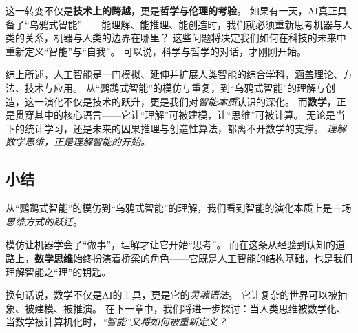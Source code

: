 这一转变不仅是\textbf{技术上的跨越}，更是\textbf{哲学与伦理的考验}。
如果有一天，AI真正具备了“乌鸦式智能”——能理解、能推理、能创造时，我们就必须重新思考机器与人类的关系，机器与人类的边界在哪里？
这些问题将决定我们如何在科技的未来中重新定义“智能”与“自我”。
可以说，科学与哲学的对话，才刚刚开始。

综上所述，人工智能是一门模拟、延伸并扩展人类智能的综合学科，涵盖理论、方法、技术与应用。
从“鹦鹉式智能”的模仿与重复，到“乌鸦式智能”的理解与创造，这一演化不仅是技术的跃升，更是我们对\emph{智能本质}认识的深化。
而\textbf{数学}，正是贯穿其中的核心语言——它让“理解”可被建模，让“思维”可被计算。
无论是当下的统计学习，还是未来的因果推理与创造性算法，都离不开数学的支撑。
\emph{理解数学思维，正是理解智能的开始。}

\subsection{小结}
从“鹦鹉式智能”的模仿到“乌鸦式智能”的理解，我们看到智能的演化本质上是一场\emph{思维方式的跃迁}。

模仿让机器学会了“做事”，理解才让它开始“思考”。
而在这条从经验到认知的道路上，\textbf{数学思维}始终扮演着桥梁的角色——它既是人工智能的结构基础，也是我们理解智能之“理”的钥匙。

换句话说，数学不仅是AI的工具，更是它的\emph{灵魂语法}。
它让复杂的世界可以被抽象、被建模、被推演。
在下一章中，我们将进一步探讨：当人类思维被数学化、当数学被计算机化时，\emph{“智能”又将如何被重新定义？}
\nocite{*}

\newpage